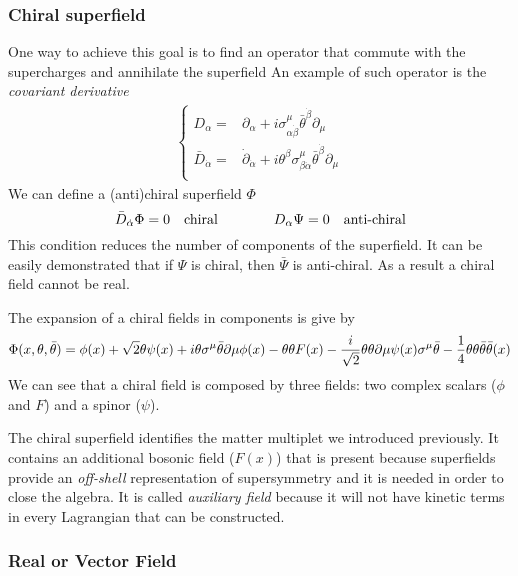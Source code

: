\begin{appendices}
\subsubsection{Chiral superfield}
One way to achieve this goal is to find an operator that commute with the supercharges and annihilate the superfield
An example of such operator is the \emph{covariant derivative} 
\begin{align}
	\begin{cases}
		D_{\alpha} =&  \partial_{\alpha} + i \sigma^{\mu}_{\alpha \dot{\beta}} \bar{\theta}^{\dot{\beta}} \partial_{\mu} \\
		\bar{D}_{\dot{\alpha}}  =&   \dot{\partial}_{\dot{\alpha}} + i  \theta^{\beta} \sigma^{\mu}_{\beta \dot{\alpha} } \bar{\theta}^{\dot{\beta}} \partial_{\mu} \\
	\end{cases}
\end{align}
We can define a (anti)chiral superfield $\Phi$ 
\begin{equation}
\bar{D}_{\dot{\alpha}}\Phi = 0 \quad \hbox{chiral} \qquad  \qquad D_{\alpha}  \Psi = 0 \quad \hbox{anti-chiral}
\end{equation}
This condition reduces the number of components of the superfield.
It can be easily demonstrated that if $\Psi$ is chiral, then $\bar{\Psi}$ is anti-chiral.
As a result a chiral field cannot be real. 

The expansion of a chiral fields in components is give by
\begin{equation}
\Phi ( x, \theta, \bar{\theta} ) = 
 \phi(x) + \sqrt{2}\theta \psi(x) + i \theta \sigma^{\mu} \bar{\theta} \partial{\mu} \phi(x) - \theta \theta F(x) - \frac{i}{\sqrt{2}} \theta \theta \partial{\mu} \psi(x) \sigma^{\mu} \bar{\theta} - \frac{1}{4} \theta \theta \bar{\theta} \bar{\theta} \box \phi(x)
 \end{equation}
We can see that a chiral field is composed by three fields: two complex scalars ($\phi$ and $F$) and a spinor ($\psi$). 

The chiral superfield identifies the matter multiplet we introduced previously. 
It contains an additional bosonic field ($F(x)$) that is present because superfields provide an \emph{off-shell} representation of supersymmetry and it is needed in order to close the algebra.
It is called \emph{auxiliary field} because it will not have kinetic terms in every Lagrangian that can be constructed. 

\subsubsection{Real or Vector Field}


\end{appendices}
